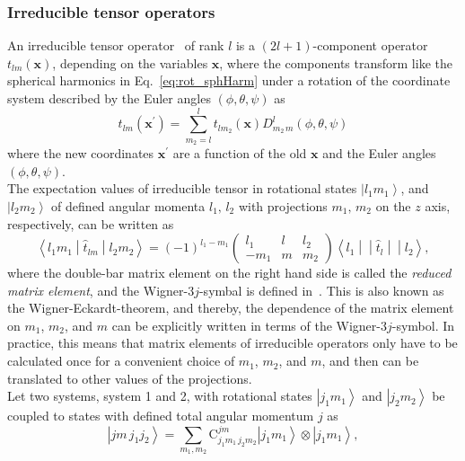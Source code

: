 \subsubsection*{Irreducible tensor operators}
An irreducible tensor operator~\cite{varshalovich1988} of rank $l$ is a $(2l+1)$-component operator $t_{lm}(\mathbf{x})$, depending on the variables $\mathbf{x}$, where the components transform like the spherical harmonics in Eq.~\eqref{eq:rot_sphHarm} under a rotation of the coordinate system described by the Euler angles $(\phi,\theta,\psi)$ as
\begin{equation}
t_{lm}(\mathbf{x}^\prime) = \sum_{m_2=l}^l t_{lm_2}(\mathbf{x}) D^l_{m_2\,m}(\phi,\theta,\psi)
\end{equation}
where the new coordinates $\mathbf{x}^\prime$ are a function of the old $\mathbf{x}$ and the Euler angles $(\phi,\theta,\psi)$.\\ 
The expectation values of irreducible tensor in rotational states $\left|l_1m_1\right>$, and $\left|l_2m_2\right>$ of defined angular momenta $l_1,\,l_2$ with projections $m_1,\,m_2$ on the $z$ axis, respectively, can be written as~\cite{varshalovich1988}
\begin{equation}
\label{app:wignerEckardt}
\left< l_1 m_1 \middle| \hat{t}_{lm} \middle| l_2 m_2\right>=
(-1)^{l_1-m_1}
\begin{pmatrix}
l_1 & l & l_2\\
-m_1 & m & m_2
\end{pmatrix}
\left<l_1 \middle|\middle| \hat{t}_{l} \middle|\middle| l_2\right>,
\end{equation}
where the double-bar matrix element on the right hand side is called the \textit{reduced matrix element}, and the Wigner-$3j$-symbal is defined in~\cite[Section 8.]{varshalovich1988}. This is also known as the Wigner-Eckardt-theorem, and thereby, the dependence of the matrix element on $m_1$, $m_2$, and $m$ can be explicitly written in terms of the Wigner-$3j$-symbol. In practice, this means that matrix elements of irreducible operators only have to be calculated once for a convenient  choice of $m_1$, $m_2$, and $m$, and then can be translated to other values of the projections.\\[9pt]
Let two systems, system 1 and 2, with rotational states $\left|j_1m_1\right>$ and $\left| j_2m_2\right>$ be  coupled to states with defined total angular momentum $j$ as
\begin{equation}
\label{eq:coupledState}
\left|jm\,j_1j_2\right> = \sum_{m_1,m_2}\text{C}^{jm}_{j_1m_1\,j_2m_2}
\left|j_1m_1\right>\otimes\left| j_1m_1\right>,
\end{equation}

